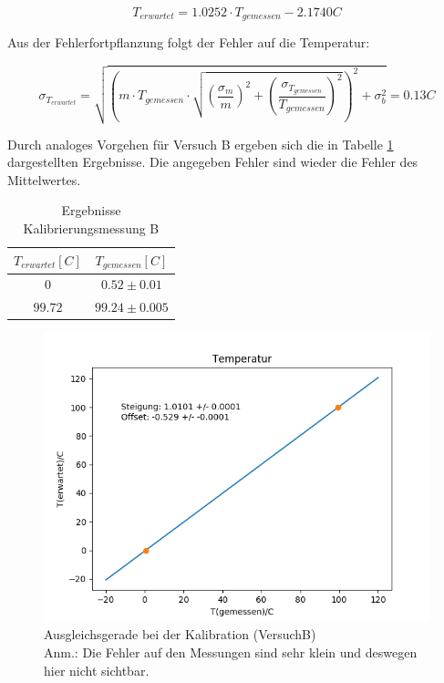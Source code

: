 \documentclass[12pt,a4paper]{article}
\begin{document}
\begin{equation}
T_{erwartet}=1.0252\cdot T_{gemessen}-2.1740C
\end{equation}

Aus der Fehlerfortpflanzung folgt der Fehler auf die Temperatur:

\begin{equation}
\sigma_{T_{erwartet}}=\sqrt{\left(m\cdot T_{gemessen}\cdot \sqrt{ (\dfrac{\sigma_m}{m})^{2}+(\dfrac{\sigma_{T_{gemessen}}}{T_{gemessen}})^{2}}\right)^{2}+\sigma_{b}^{2}}=0.13C
\end{equation}

Durch analoges Vorgehen für Versuch B ergeben sich die in Tabelle \ref{tab:KaliB} dargestellten Ergebnisse. Die angegeben Fehler sind wieder die Fehler des Mittelwertes.


\begin{table}[H]
\begin{center}
\begin{tabular}{|c|c|}
\hline 
$T_{erwartet}[C]$ & $T_{gemessen}[C]$ \\ 
\hline 
$0$ & $0.52 \pm 0.01$ \\ 
\hline 
$99.72$ & $99.24\pm 0.005$ \\ %
\hline 
\end{tabular}
\caption[Ergebnisse Kalibrierungsmessung B]{Ergebnisse Kalibrierungsmessung B}
\label{tab:KaliB}
\end{center}
\end{table}


\begin{figure}[H]
\includegraphics[width=\linewidth]{Bilder/KalibrationB}
\begin{center}
\caption[KalibrationB]{Ausgleichsgerade bei der Kalibration (VersuchB)\\
Anm.: Die Fehler auf den Messungen sind sehr klein und deswegen hier nicht sichtbar.}
\label{fig:GeradeKaliB}
\end{center}
\end{figure}
\end{document}
